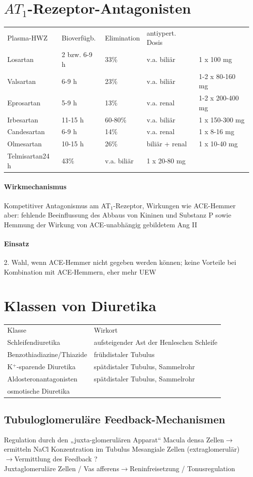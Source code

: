 \documentclass[10pt,a4paper]{report}
\begin{document}
\section{$AT_1$-Rezeptor-Antagonisten}
\begin{tabularx}{\textwidth}{XXXXX}
Plasma-HWZ&Bioverfügb.&Elimination&antiypert. Dosis\\
Losartan&2 bzw. 6-9 h&33\%&v.a. biliär&1 x 100 mg\\	
Valsartan&6-9 h&23\%&v.a. biliär&1-2 x 80-160 mg\\
Eprosartan&5-9 h&13\%&v.a. renal&1-2 x 200-400 mg\\
Irbesartan&11-15 h&60-80\%&	v.a. biliär&1 x 150-300 mg\\ 
Candesartan&6-9 h&14\%&v.a. renal&1 x 8-16 mg\\	
Olmesartan&10-15 h&26\%&biliär + renal&1 x 10-40 mg\\
Telmisartan24 h&43\%&v.a. biliär&1 x 20-80 mg\\ 
\end{tabularx}
\paragraph{Wirkmechanismus}Kompetitiver Antagonismus am AT$_1$-Rezeptor, Wirkungen wie ACE-Hemmer aber:	fehlende Beeinflussung des Abbaus von Kininen und Substanz P sowie Hemmung der Wirkung von ACE-unabhängig gebildetem Ang II
\paragraph{Einsatz} 2. Wahl, wenn ACE-Hemmer nicht gegeben werden können; keine Vorteile bei Kombination mit ACE-Hemmern, eher mehr UEW
\section{Klassen von Diuretika}
\begin{tabularx}{\textwidth}{XX}
Klasse&Wirkort\\
Schleifendiuretika&aufsteigender Ast der Henleschen Schleife\\
Benzothiadiazine/Thiazide&frühdistaler Tubulus\\
K$^+$-sparende Diuretika&spätdistaler Tubulus, Sammelrohr\\
Aldosteronantagonisten&	spätdistaler Tubulus, Sammelrohr\\
osmotische Diuretika&\\
\end{tabularx}
\subsection{Tubuloglomeruläre Feedback-Mechanismen}
Regulation durch den „juxta-glomerulären Apparat“ Macula densa Zellen$\rightarrow$ermitteln NaCl Konzentration im Tubulus Mesangiale Zellen (extraglomerulär)$\rightarrow$Vermittlung des Feedback ?
\\ 
Juxtaglomeruläre Zellen / Vas afferens$\rightarrow$Reninfreisetzung / Tonusregulation
\end{document}
